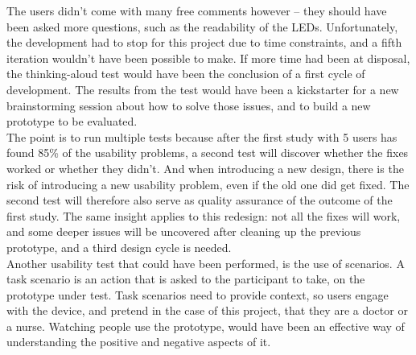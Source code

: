 The users didn't come with many free comments however -- they should have been asked more questions, such as the readability of the LEDs. Unfortunately, the development had to stop for this project due to time constraints, and a fifth iteration wouldn't have been possible to make. If more time had been at disposal, the thinking-aloud test would have been the conclusion of a first cycle of development. The results from the test would have been a kickstarter for a new brainstorming session about how to solve those issues, and to build a new prototype to be evaluated. \\

The point is to run multiple tests because after the first study with 5 users has found 85\% of the usability problems, a second test will discover whether the fixes worked or whether they didn't. And when introducing a new design, there is the risk of introducing a new usability problem, even if the old one did get fixed. The second test will therefore also serve as quality assurance of the outcome of the first study. The same insight applies to this redesign: not all the fixes will work, and some deeper issues will be uncovered after cleaning up the previous prototype, and a third design cycle is needed. \\

Another usability test that could have been performed, is the use of scenarios. A task scenario is an action that is asked to the participant to take, on the prototype under test. Task scenarios need to provide context, so users engage with the device, and pretend in the case of this project, that they are a doctor or a nurse. Watching people use the prototype, would have been an effective way of understanding the positive and negative aspects of it.